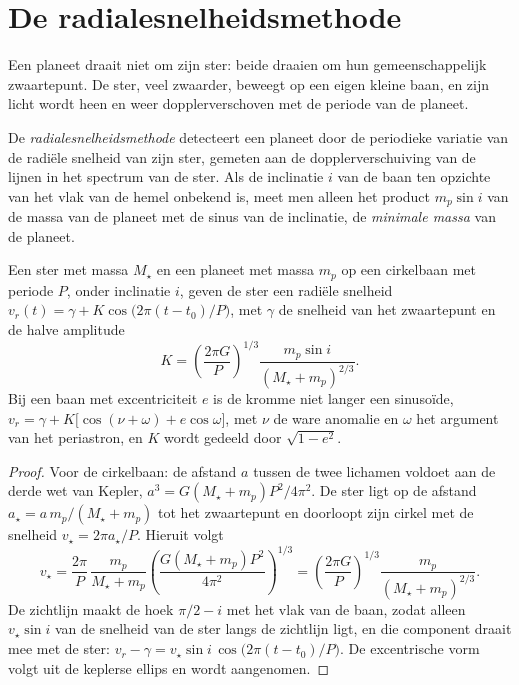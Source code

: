 \section{De radialesnelheidsmethode}\label{sec:b3:exoplanets:rv}

Een planeet draait niet om zijn ster: beide draaien om hun gemeenschappelijk zwaartepunt.
De ster, veel zwaarder, beweegt op een eigen kleine baan, en zijn licht
wordt heen en weer dopplerverschoven met de periode van de planeet.

\begin{definition}\label{def:b3:exoplanets:rv}
De \emph{radialesnelheidsmethode} detecteert een
planeet door de periodieke variatie van de radiële snelheid van zijn ster,
gemeten aan de dopplerverschuiving van de lijnen in het spectrum van de ster. Als
de inclinatie $i$ van de baan ten opzichte van het vlak van de hemel onbekend is, meet men
alleen het product $m_p\sin i$ van de massa van de planeet met de sinus van
de inclinatie, de \emph{minimale massa} van de
planeet.
\end{definition}

\begin{theorem}\label{thm:b3:exoplanets:semi-amplitude}
Een ster met massa $M_\star$ en een planeet met massa $m_p$ op een cirkelbaan met
periode $P$, onder inclinatie $i$, geven de ster een radiële snelheid
$v_r(t) = \gamma + K\cos\bigl(2\pi(t - t_0)/P\bigr)$, met $\gamma$ de
snelheid van het zwaartepunt en de halve amplitude
\[
K = \left(\frac{2\pi G}{P}\right)^{1/3}
    \frac{m_p\sin i}{(M_\star + m_p)^{2/3}} .
\]
Bij een baan met excentriciteit $e$ is de kromme niet langer een sinusoïde,
$v_r = \gamma + K\bigl[\cos(\nu + \omega) + e\cos\omega\bigr]$, met $\nu$
de ware anomalie en $\omega$ het argument van het periastron, en $K$ wordt
gedeeld door $\sqrt{1 - e^2}$.
\end{theorem}

\begin{proof}
Voor de cirkelbaan: de afstand $a$ tussen de twee lichamen voldoet aan
de derde wet van Kepler, $a^3 = G(M_\star + m_p)P^2/4\pi^2$. De ster ligt op
de afstand $a_\star = a\,m_p/(M_\star + m_p)$ tot het zwaartepunt
en doorloopt zijn cirkel met de snelheid $v_\star = 2\pi a_\star/P$. Hieruit volgt
\[
v_\star = \frac{2\pi}{P}\,\frac{m_p}{M_\star + m_p}
          \left(\frac{G(M_\star + m_p)P^2}{4\pi^2}\right)^{1/3}
        = \left(\frac{2\pi G}{P}\right)^{1/3}\frac{m_p}{(M_\star + m_p)^{2/3}} .
\]
De zichtlijn maakt de hoek $\pi/2 - i$ met het vlak van de
baan, zodat alleen $v_\star\sin i$ van de snelheid van de ster langs de zichtlijn ligt, en
die component draait mee met de ster: $v_r - \gamma = v_\star\sin i\,
\cos\bigl(2\pi(t - t_0)/P\bigr)$. De excentrische vorm volgt uit de
keplerse ellips en wordt aangenomen.
\end{proof}

